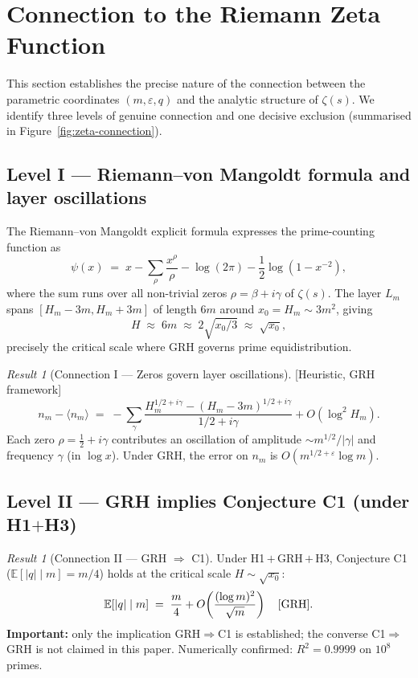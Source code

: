 \documentclass[11pt,a4paper]{article}
\theoremstyle{definition}
\theoremstyle{remark}
\newtheorem{result}[theorem]{Result}
\newcommand{\E}{\mathbb{E}}
\newcommand{\eps}{\varepsilon}
\begin{document}
\section{Connection to the Riemann Zeta Function}\label{sec:zeta}

This section establishes the precise nature of the connection between
the parametric coordinates $(m,\eps,q)$ and the analytic structure of
$\zeta(s)$. We identify three levels of genuine connection and one
decisive exclusion (summarised in Figure~\ref{fig:zeta-connection}).

\subsection{Level I --- Riemann--von Mangoldt formula and layer
oscillations}

The Riemann--von Mangoldt explicit formula expresses the
prime-counting function as
\[
  \psi(x)\;=\;x-\sum_{\rho}\frac{x^{\rho}}{\rho}-\log(2\pi)
   -\frac{1}{2}\log(1-x^{-2}),
\]
where the sum runs over all non-trivial zeros $\rho=\beta+i\gamma$ of
$\zeta(s)$. The layer $L_{m}$ spans
$[H_{m}-3m,H_{m}+3m]$ of length $6m$ around $x_{0}=H_{m}\sim 3m^{2}$,
giving
\[
  H\;\approx\;6m\;\approx\;2\sqrt{x_{0}/3}\;\approx\;\sqrt{x_{0}},
\]
precisely the critical scale where GRH governs prime equidistribution.

\begin{connectionbox}
\begin{result}[Connection I --- Zeros govern layer oscillations]
\label{res:level-I}
\textnormal{[Heuristic, GRH framework]}
\[
  n_{m}-\langle n_{m}\rangle
  \;=\;-\sum_{\gamma}\frac{H_{m}^{1/2+i\gamma}-(H_{m}-3m)^{1/2+i\gamma}}
       {1/2+i\gamma}+O(\log^{2}H_{m}).
\]
Each zero $\rho=\tfrac{1}{2}+i\gamma$ contributes an oscillation of
amplitude $\sim m^{1/2}/|\gamma|$ and frequency $\gamma$ (in
$\log x$). Under \textup{GRH}, the error on $n_{m}$ is
$O(m^{1/2+\eps}\log m)$.
\end{result}
\end{connectionbox}

\subsection{Level II --- GRH implies Conjecture C1 (under H1$+$H3)}

\begin{heuristicbox}
\begin{result}[Connection II --- GRH $\Rightarrow$ C1]\label{res:level-II}
Under \textup{H1}\,$+$\,\textup{GRH}\,$+$\,\textup{H3}, Conjecture
C1 ($\E[|q|\mid m]=m/4$) holds at the critical scale
$H\sim\sqrt{x_{0}}$:
\[
  \E[|q|\mid m]\;=\;\frac{m}{4}+O\!\left(\frac{(\log m)^{2}}{\sqrt{m}}\right)
  \quad[\textup{GRH}].
\]
\textbf{Important:} only the implication \textup{GRH}$\Rightarrow$C1
is established; the converse C1$\Rightarrow$\textup{GRH} is not
claimed in this paper. Numerically confirmed: $R^{2}=0.9999$ on
$10^{8}$ primes.
\end{result}
\end{heuristicbox}
\end{document}
